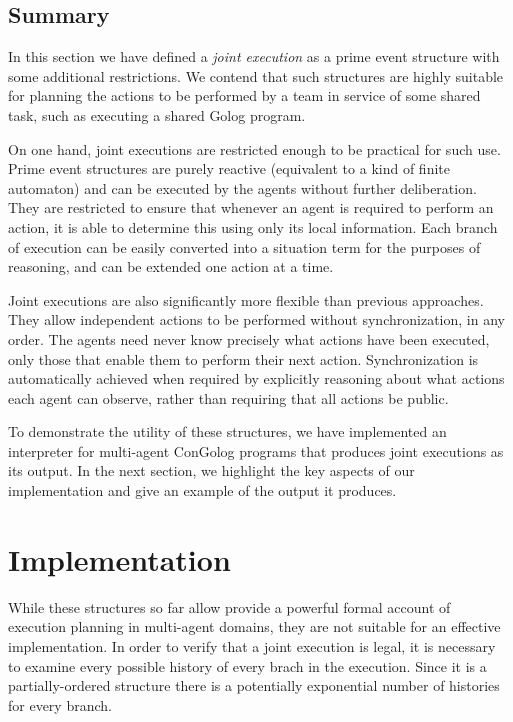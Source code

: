 \subsection{Summary\label{sec:JointExec:Summary}}

In this section we have defined a \emph{joint execution} as a prime
event structure with some additional restrictions. We contend that
such structures are highly suitable for planning the actions to be
performed by a team in service of some shared task, such as executing
a shared Golog program.

On one hand, joint executions are restricted enough to be practical
for such use. Prime event structures are purely reactive (equivalent
to a kind of finite automaton) and can be executed by the agents without
further deliberation. They are restricted to ensure that whenever
an agent is required to perform an action, it is able to determine
this using only its local information. Each branch of execution can
be easily converted into a situation term for the purposes of reasoning,
and can be extended one action at a time.

Joint executions are also significantly more flexible than previous
approaches. They allow independent actions to be performed without
synchronization, in any order. The agents need never know precisely
what actions have been executed, only those that enable them to perform
their next action. Synchronization is automatically achieved when
required by explicitly reasoning about what actions each agent can
observe, rather than requiring that all actions be public.

To demonstrate the utility of these structures, we have implemented
an interpreter for multi-agent ConGolog programs that produces joint
executions as its output. In the next section, we highlight the key
aspects of our implementation and give an example of the output it
produces.


\section{Implementation\label{sec:JointExec:Implementation}}

While these structures so far allow provide a powerful formal account
of execution planning in multi-agent domains, they are not suitable
for an effective implementation. In order to verify that a joint execution
is legal, it is necessary to examine every possible history of every
brach in the execution. Since it is a partially-ordered structure
there is a potentially exponential number of histories for every branch. 


